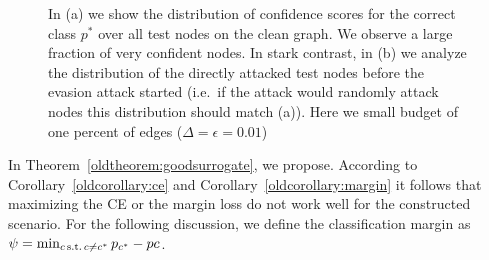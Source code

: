 \documentclass[sigconf,authordraft]{acmart}
\begin{document}
\begin{figure}[t]
  \centering
  \caption{In (a) we show the distribution of confidence scores for the correct class \(p^*\) over all test nodes on the clean graph. We observe a large fraction of very confident nodes. In stark contrast, in (b) we analyze the distribution of the directly attacked test nodes before the evasion attack started (i.e.\ if the attack would randomly attack nodes this distribution should match (a)). Here we small budget of one percent of edges (\(\Delta=\epsilon=0.01\))\label{oldfig:negceprob}}
\end{figure}

In Theorem~\ref{oldtheorem:goodsurrogate}, we propose. According to Corollary~\ref{oldcorollary:ce} and Corollary~\ref{oldcorollary:margin} it follows that maximizing the CE or the margin loss do not work well for the constructed scenario. For the following discussion, we define the classification margin as \(\psi = \min_{c \,\text{s.t.}\, c \ne c^*} {p}_{c^*} - {p}{c}\).

\end{document}
